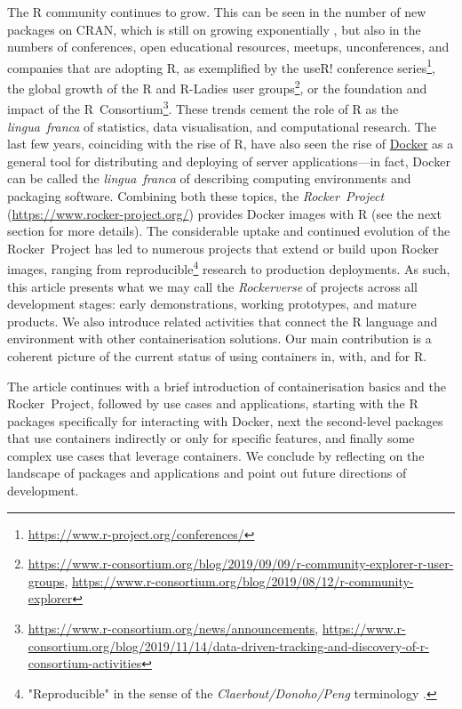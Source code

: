 The R community continues to grow. This can be seen in the number of new
packages on CRAN, which is still on growing exponentially
\citep{cran:2019}, but also in the numbers of conferences, open
educational resources, meetups, unconferences, and companies that are
adopting R, as exemplified by the useR! conference
series\footnote{\href{https://www.r-project.org/conferences/}{https://www.r-project.org/conferences/}},
the global growth of the R and R-Ladies user
groups\footnote{\href{https://www.r-consortium.org/blog/2019/09/09/r-community-explorer-r-user-groups}{https://www.r-consortium.org/blog/2019/09/09/r-community-explorer-r-user-groups}, \href{https://www.r-consortium.org/blog/2019/08/12/r-community-explorer}{https://www.r-consortium.org/blog/2019/08/12/r-community-explorer}},
or the foundation and impact of the
R~Consortium\footnote{\href{https://www.r-consortium.org/news/announcements}{https://www.r-consortium.org/news/announcements}, \href{https://www.r-consortium.org/blog/2019/11/14/data-driven-tracking-and-discovery-of-r-consortium-activities}{https://www.r-consortium.org/blog/2019/11/14/data-driven-tracking-and-discovery-of-r-consortium-activities}}.
These trends cement the role of R as the \emph{lingua~franca} of
statistics, data visualisation, and computational research. The last few
years, coinciding with the rise of R, have also seen the rise of
\href{https://en.wikipedia.org/wiki/Docker_(software)}{Docker} as a
general tool for distributing and deploying of server applications---in
fact, Docker can be called the \emph{lingua~franca} of describing
computing environments and packaging software. Combining both these
topics, the \emph{Rocker~Project}
(\url{https://www.rocker-project.org/}) provides Docker images with R
(see the next section for more details). The considerable uptake and
continued evolution of the Rocker~Project has led to numerous projects
that extend or build upon Rocker images, ranging from
reproducible\footnote{"Reproducible" in the sense of the \emph{Claerbout/Donoho/Peng} terminology \citep{barba_terminologies_2018}.}
research to production deployments. As such, this article presents what
we may call the \emph{Rockerverse} of projects across all development
stages: early demonstrations, working prototypes, and mature products.
We also introduce related activities that connect the R language and
environment with other containerisation solutions. Our main contribution
is a coherent picture of the current status of using containers in,
with, and for R.

The article continues with a brief introduction of containerisation
basics and the Rocker~Project, followed by use cases and applications,
starting with the R packages specifically for interacting with Docker,
next the second-level packages that use containers indirectly or only
for specific features, and finally some complex use cases that leverage
containers. We conclude by reflecting on the landscape of packages and
applications and point out future directions of development.


